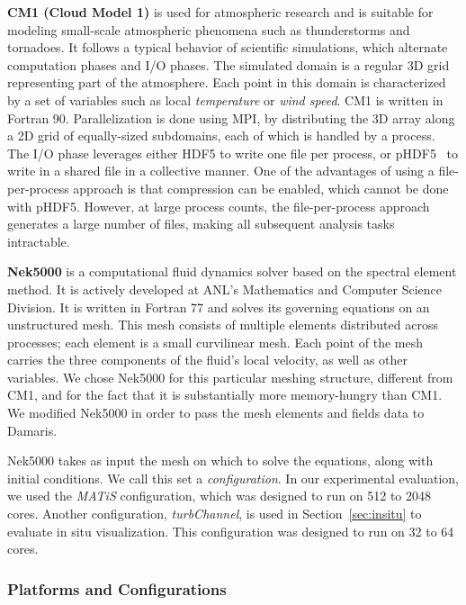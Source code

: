 \begin{description}
\item{\textbf{CM1 (Cloud Model 1)}} is used for atmospheric research and is suitable
for modeling small-scale atmospheric phenomena such as thunderstorms
and tornadoes. It follows a typical behavior of scientific simulations,
which alternate computation phases and I/O phases. The simulated domain
is a regular 3D grid representing part of the atmosphere. 
Each point in this domain is characterized by a set of
variables such as local \emph{temperature} or \emph{wind speed}.
CM1 is written in Fortran 90. Parallelization is done using MPI, by
distributing the 3D array along a 2D grid of equally-sized subdomains, each of which
is handled by a process. 
The I/O phase leverages either HDF5 to write one file per
process, or pHDF5~\cite{chilan2006parallel} to write in a shared file in a collective manner.
One of the advantages of using a file-per-process approach is
that compression can be enabled, which cannot be done with pHDF5.
However, at large process counts, the file-per-process approach
generates a large number of files, making all subsequent analysis tasks
intractable.

\item{\textbf{Nek5000}} is a computational fluid dynamics solver based on 
the spectral element method. It is actively developed at ANL's Mathematics 
and Computer Science Division. 
It is written in Fortran 77 and solves its governing equations on an 
unstructured mesh. This mesh consists of multiple 
elements distributed across processes; each element is a small curvilinear mesh.
Each point of the mesh carries
the three components of the fluid's local velocity, as well as other variables.
We chose Nek5000 for this particular meshing structure, different from CM1,
and for the fact that it is substantially more memory-hungry than CM1.
We modified Nek5000 in order to pass the mesh elements and fields data to Damaris.

Nek5000 takes as input the mesh on which to solve the equations, along with 
initial conditions. We call this set a \emph{configuration}. In our
experimental evaluation, we used the \emph{MATiS} configuration, which was
designed to run on 512 to 2048 cores. Another configuration, \emph{turbChannel},
is used in Section~\ref{sec:insitu} to evaluate in situ visualization. This configuration was
designed to run on 32 to 64 cores.
\end{description}

\subsubsection{Platforms and Configurations}

